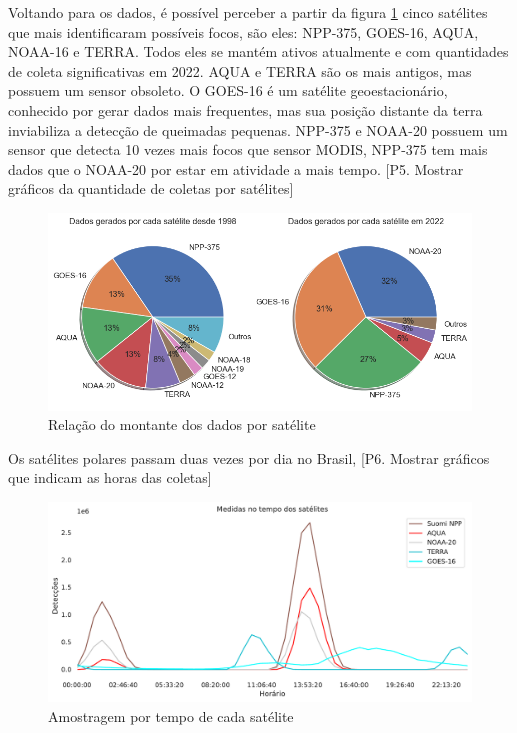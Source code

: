 \documentclass[cic,tc]{iiufrgs}
\begin{document}
Voltando para os dados, é possível perceber a partir da figura
\ref{fig:porcentagem_satelites} cinco satélites que mais identificaram possíveis 
focos, são eles: NPP-375, GOES-16, AQUA, NOAA-16 e TERRA. Todos eles se mantém
ativos atualmente e com quantidades de coleta significativas em 2022. AQUA e TERRA 
são os mais antigos, mas possuem um sensor obsoleto. O GOES-16 é um satélite
geoestacionário, conhecido por gerar dados mais frequentes, mas sua
posição distante da terra inviabiliza a detecção de queimadas pequenas. NPP-375 e
NOAA-20 possuem um sensor que detecta 10 vezes mais focos que sensor MODIS, 
NPP-375 tem mais dados que o NOAA-20 por estar em atividade a mais tempo.
[P5. Mostrar gráficos da quantidade de coletas por satélites] \par

\begin{figure}
    \caption{Relação do montante dos dados por satélite}
    \begin{center}
        \includegraphics[width=35em]{porcentagem_satelites}
    \end{center}
    \label{fig:porcentagem_satelites}
\end{figure}

Os satélites polares passam duas vezes por dia no Brasil, 
[P6. Mostrar gráficos que indicam as horas das coletas] \par

\begin{figure}
    \caption{Amostragem por tempo de cada satélite}
    \begin{center}
        \includegraphics[width=35em]{tempo_medidas_satelites}
    \end{center}
    \label{fig:tempo_medidas_satelites}
\end{figure}
\end{document}
